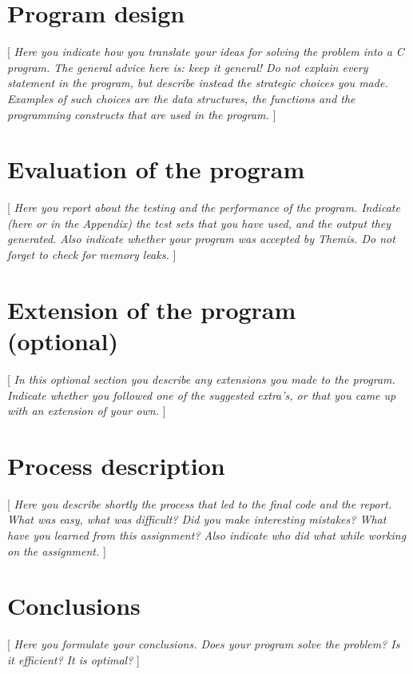 \documentclass[a4paper]{article}
\begin{document}
\section{Program design}

[ \textit{Here you indicate how you translate your ideas for solving the problem into a C program. 
The general advice here is: keep it general! 
Do not explain every statement in the program, but describe instead the strategic choices you made. 
Examples of such choices are the data structures, the functions and the programming constructs that are used in the program.} ]

\section{Evaluation of the program}

[ \textit{Here you report about the testing and the performance of the program. 
Indicate (here or in the Appendix) the test sets that you have used, and the output they generated. 
Also indicate whether your program was accepted by Themis. 
Do not forget to check for memory leaks.} ]

\section{Extension of the program (optional)}

[ \textit{In this optional section you describe any extensions you made to the program. 
Indicate whether you followed one of the suggested extra's, or that you came up with an extension of your own.} ]

\section{Process description}

[ \textit{Here you describe shortly the process that led to the final code and the report. 
What was easy, what was difficult? 
Did you make interesting mistakes?  
What have you learned from this assignment? 
Also indicate who did what while working on the assignment.} ]

\section{Conclusions}

[ \textit{Here you formulate your conclusions. Does your program solve the problem? Is it efficient? It is optimal?} ]
\end{document}
